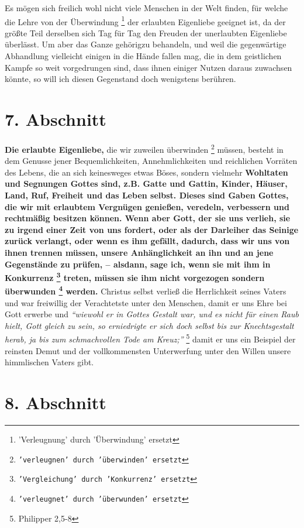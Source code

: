 Es mögen sich freilich wohl nicht viele Menschen in der Welt finden, für welche
die Lehre von der Überwindung \footnote{'Verleugnung' durch 'Überwindung'
ersetzt} der erlaubten Eigenliebe geeignet ist, da der
größte Teil derselben sich Tag für Tag den Freuden der unerlaubten
Eigenliebe überlässt. Um aber das Ganze gehörigzu behandeln, und weil die
gegenwärtige Abhandlung vielleicht einigen in die Hände fallen mag, die in dem
geistlichen Kampfe so weit vorgedrungen sind, dass ihnen einiger Nutzen daraus
zuwachsen könnte, so will ich diesen Gegenstand doch wenigstens berühren.

\section{7. Abschnitt} \label{kap4_ab7}

\textbf{Die erlaubte Eigenliebe,} die wir zuweilen überwinden
\footnote{\texttt{'verleugnen' durch 'überwinden' ersetzt}} müssen, besteht in dem
Genusse jener Bequemlichkeiten, Annehmlichkeiten und reichlichen Vorräten des
Lebens, die an sich keinesweges etwas Böses, sondern vielmehr \textbf{Wohltaten
und
Segnungen Gottes sind, z.B. Gatte und Gattin, Kinder, Häuser, Land, Ruf,
Freiheit und das Leben selbst. Dieses sind Gaben Gottes, die wir mit erlaubtem
Vergnügen genießen, veredeln, verbessern und rechtmäßig besitzen können. Wenn
aber Gott, der sie uns verlieh, sie zu irgend einer Zeit von uns fordert, oder
als der Darleiher das Seinige zurück verlangt, oder wenn es ihm gefällt,
dadurch, dass wir uns von ihnen trennen müssen, unsere Anhänglichkeit an ihn und
an jene Gegenstände zu prüfen, -- alsdann, sage ich, wenn sie mit ihm in
Konkurrenz \footnote{\texttt{'Vergleichung' durch 'Konkurrenz' ersetzt}} treten, müssen
sie ihm nicht vorgezogen sondern überwunden \footnote{\texttt{'verleugnet' durch
'überwunden' ersetzt}} werden.}
Christus selbst verließ die Herrlichkeit seines Vaters und war freiwillig der
Verachtetste unter den Menschen, damit er uns Ehre bei Gott erwerbe und
\textit{"`wiewohl er in Gottes Gestalt war, und es nicht für einen Raub hielt,
Gott
gleich zu sein, so erniedrigte er sich doch selbst bis zur Knechtsgestalt
herab, ja bis zum schmachvollen Tode am Kreuz;"'}
\footnote{Philipper 2,5-8}
damit er
uns ein Beispiel der reinsten Demut und der vollkommensten Unterwerfung unter
den Willen unsere himmlischen Vaters gibt.

\section{8. Abschnitt} \label{kap4_ab8}

